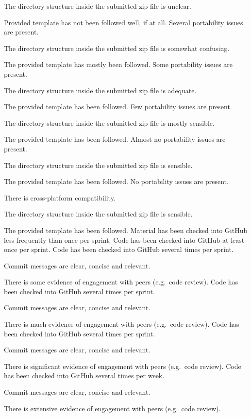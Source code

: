 \documentclass{../../fal_assignment}
\begin{document}
\begin{markingrubric}
            \par The directory structure inside the submitted zip file is unclear.
            \par Provided template has not been followed well, if at all.
        \grade Several portability issues are present.
            \par The directory structure inside the submitted zip file is somewhat confusing.
            \par The provided template has mostly been followed.
        \grade Some portability issues are present.
            \par The directory structure inside the submitted zip file is adequate.
            \par The provided template has been followed.
        \grade Few portability issues are present.
            \par The directory structure inside the submitted zip file is mostly sensible.
            \par The provided template has been followed.
        \grade Almost no portability issues are present.
            \par The directory structure inside the submitted zip file is sensible.
            \par The provided template has been followed.
        \grade No portability issues are present.
            \par There is cross-platform compatibility.
            \par The directory structure inside the submitted zip file is sensible.
            \par The provided template has been followed.
%
        \grade \fail Material has been checked into GitHub less frequently than once per sprint.
        \grade Code has been checked into GitHub at least once per sprint.
        \grade Code has been checked into GitHub several times per sprint.
            \par Commit messages are clear, concise and relevant.
            \par There is some evidence of engagement with peers (e.g.\ code review).
        \grade Code has been checked into GitHub several times per sprint.
            \par Commit messages are clear, concise and relevant.
            \par There is much evidence of engagement with peers (e.g.\ code review).
        \grade Code has been checked into GitHub several times per sprint.
            \par Commit messages are clear, concise and relevant.
            \par There is significant evidence of engagement with peers (e.g.\ code review).
        \grade Code has been checked into GitHub several times per week.
            \par Commit messages are clear, concise and relevant.
            \par There is extensive evidence of engagement with peers (e.g.\ code review).
\end{markingrubric}
\end{document}
